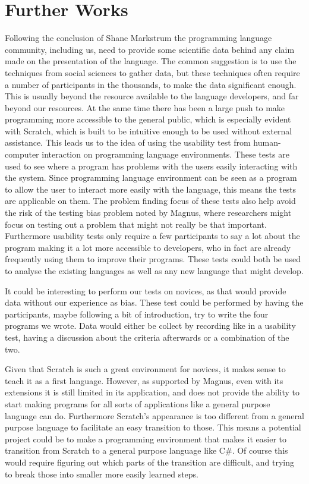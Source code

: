 \section{Further Works}
\label{sec:further_works}
Following the conclusion of Shane Markstrum\cite{ShaneMarkstrum10} the programming language community, including us, need to provide some scientific data behind any claim made on the presentation of the language.
The common suggestion is to use the techniques from social sciences to gather data\cite{Socio-plt}, but these techniques often require a number of participants in the thousands, to make the data significant enough.
This is usually beyond the resource available to the language developers, and far beyond our resources.
At the same time there has been a large push to make programming more accessible to the general public, which is especially evident with Scratch, which is built to be intuitive enough to be used without external assistance.
This leads us to the idea of using the usability test from human-computer interaction on programming language environments.
These tests are used to see where a program has problems with the users easily interacting with the system.
Since programming language environment can be seen as a program to allow the user to interact more easily with the language, this means the tests are applicable on them.
The problem finding focus of these tests also help avoid the risk of the testing bias problem noted by Magnus, where researchers might focus on testing out a problem that might not really be that important.
Furthermore usability tests only require a few participants to say a lot about the program making it a lot more accessible to developers, who in fact are already frequently using them to improve their programs.
These tests could both be used to analyse the existing languages as well as any new language that might develop.

It could be interesting to perform our tests on novices, as that would provide data without our experience as bias.
These test could be performed by having the participants, maybe following a bit of introduction, try to write the four programs we wrote.
Data would either be collect by recording like in a usability test, having a discussion about the criteria afterwards or a combination of the two.

Given that Scratch is such a great environment for novices, it makes sense to teach it as a first language.
However, as supported by Magnus, even with its extensions it is still limited in its application, and does not provide the ability to start making programs for all sorts of applications like a general purpose language can do.
Furthermore Scratch's appearance is too different from a general purpose language to facilitate an easy transition to those.
This means a potential project could be to make a programming environment that makes it easier to transition from Scratch to a general purpose language like C\#.
Of course this would require figuring out which parts of the transition are difficult, and trying to break those into smaller more easily learned steps.

